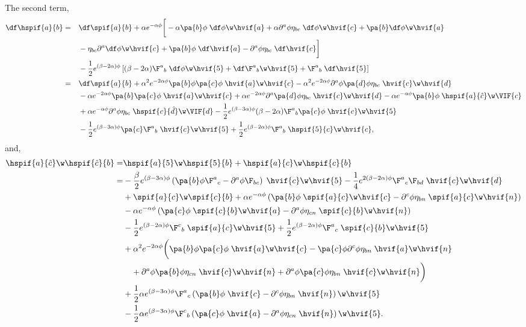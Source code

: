 The second term,
\begin{align}
  \df\hspif{a}{b} =&\quad \df \spif{a}{b} +\alpha e^{-\alpha\phi}\bigg[-\alpha\pa{b}\phi\;\df\phi\w\hvif{a} + \alpha\partial^a \phi \eta_{bc}\;\df\phi\w\hvif{c} + \pa{b}\df\phi\w\hvif{a} \notag\\
    &\quad- \eta_{b c}\partial^a\df\phi\w\hvif{c} + \pa{b}\phi\;\df\hvif{a} - \partial^a\phi\eta_{bc}\; \df\hvif{c}\bigg]\nonumber\\
  &\quad - \frac{1}{2}e^{(\beta-2\alpha)\phi}\left[ (\beta-2\alpha)\F^a{}_b\;\df\phi\w\hvif{5} + \df\F^a{}_b\w\hvif{5} + \F^a{}_b\;\df\hvif{5}\right]\notag\\
  =&\quad \df\spif{a}{b} + \alpha^2 e^{-2\alpha\phi}\pa{b}\phi\pa{c}\phi\;\hvif{a}\w\hvif{c} - \alpha^2 e^{-2\alpha\phi}\partial^{a}\phi\pa{d}\phi\eta_{bc}\;\hvif{c}\w\hvif{d}\notag\\
    &\quad- \alpha e^{-2\alpha\phi} \pa{b}\pa{c}\phi\; \hvif{a}\w\hvif{c} + \alpha e^{-2\alpha\phi} \partial^{a}\pa{d}\phi\eta_{bc}\; \hvif{c}\w\hvif{d} - \alpha e^{-\alpha\phi} \pa{b}\phi \;\hspif{a}{\hat{c}}\w\VIF{c}\notag\\
  &\quad + \alpha e^{-\alpha\phi} \partial^{a}\phi \eta_{bc}\;\hspif{c}{\hat{d}}\w\VIF{d} - \frac{1}{2} e^{(\beta-3\alpha)\phi}(\beta-2\alpha)\F^a{}_b\pa{c}\phi\;\hvif{c}\w\hvif{5}\\
&\quad - \frac{1}{2}e^{(\beta-3\alpha)\phi} \pa{c}\F^a{}_b\;\hvif{c}\w\hvif{5} + \frac{1}{2}e^{(\beta-2\alpha)\phi}\F^a{}_b\;\hspif{5}{c}\w\hvif{c},\notag
\end{align}
and,
\begin{align}
  \hspif{a}{\hat{c}}\w\hspif{\hat{c}}{b} =& \hspif{a}{5}\w\hspif{5}{b} + \hspif{a}{{c}}\w\hspif{{c}}{b} \notag\\
  =& -\frac{\beta}{2} e^{(\beta-3\alpha)\phi}\left(\pa{b}\phi \F^a{}_c - \partial^{a}\phi \F_{bc}\right)\;\hvif{c}\w\hvif{5} -\frac{1}{4}e^{2(\beta-2\alpha)\phi}\F^a{}_c \F_{bd}\;\hvif{c}\w\hvif{d}\notag\\
  & + \spif{a}{c}\w\spif{c}{b} + \alpha e^{-\alpha\phi}\left(\pa{b}\phi\;\spif{a}{c}\w\hvif{c} - \partial^c\phi\eta_{bn}\;\spif{a}{c}\w\hvif{n}  \right) \notag\\
  &-  \alpha e^{-\alpha\phi}\left(\pa{c}\phi\;\spif{c}{b}\w\hvif{a} - \partial^a\phi\eta_{cn}\;\spif{c}{b}\w\hvif{n}  \right)\notag\\
  & -\frac{1}{2} e^{(\beta-2\alpha)\phi}\F^c{}_b\;\spif{a}{c}\w\hvif{5} + \frac{1}{2} e^{(\beta-2\alpha)\phi}\F^a{}_c\;\spif{c}{b}\w\hvif{5} \notag\\
  &  + \alpha^2 e^{-2\alpha\phi}\bigg(\pa{b}\phi\pa{c}\phi\;\hvif{a}\w\hvif{c}  - \pa{c}\phi\partial^c\phi\eta_{bn}\;\hvif{a}\w\hvif{n}\notag\\
  &\quad + \partial^a\phi\pa{b}\phi\eta_{cn}\;\hvif{c}\w\hvif{n} + \partial^a\phi\pa{c}\phi\eta_{bn}\;\hvif{c}\w\hvif{n}\bigg)\notag\\
   & + \frac{1}{2}\alpha e^{(\beta-3\alpha)\phi}\F^a{}_c\left( \pa{b}\phi\;\hvif{c} - \partial^c\phi\eta_{bn}\;\hvif{n}\right)\w\hvif{5} \notag\\
  &- \frac{1}{2}\alpha e^{(\beta-3\alpha)\phi}\F^c{}_b\left( \pa{c}\phi\;\hvif{a} - \partial^a\phi\eta_{cn}\;\hvif{n}\right)\w\hvif{5}.
\end{align}

